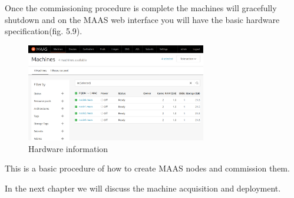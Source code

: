 Once the commissioning procedure is complete the machines will gracefully shutdown and on the MAAS web interface you will have the basic hardware specification(fig. 5.9).

\begin{figure}[!ht]
    \centering
    \includegraphics[width=0.7\textwidth]{images/5-9.png}
    \caption{Hardware information}
\end{figure}

This is a basic procedure of how to create MAAS nodes and commission them.

In the next chapter we will discuss the machine acquisition and deployment.